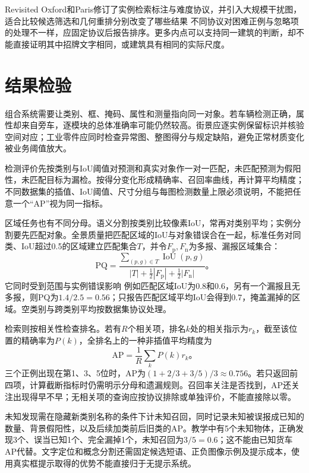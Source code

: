 Revisited Oxford和Paris修订了实例检索标注与难度协议，并引入大规模干扰图，适合比较候选筛选和几何重排分别改变了哪些结果
不同协议对困难正例与忽略项的处理不一样，应固定协议后报告排序。更多内点可以支持同一建筑的判断，却不能直接证明其中招牌文字相同，或建筑具有相同的实际尺度。

\section{结果检验}
\label{sec:vision-recognition-evaluation}

组合系统需要让类别、框、掩码、属性和测量指向同一对象。若车辆检测正确，属性却来自旁车，逐模块的总体准确率可能仍然较高。街景应逐实例保留标识并核验空间对应；工业零件应同时检查异常图、整图得分与规定缺陷，避免正常材质变化被业务阈值放大。

检测评价先按类别与IoU阈值对预测和真实对象作一对一匹配，未匹配预测为假阳性，未匹配目标为漏检。按得分变化形成精确率、召回率曲线，再计算平均精度；不同数据集的插值、IoU阈值、尺寸分组与每图检测数量上限必须说明，不能把任意一个“AP”视为同一指标。

区域任务也有不同分母。语义分割按类别比较像素IoU，常再对类别平均；实例分割要先匹配对象。全景质量把匹配区域的IoU与对象错误合在一起，标准任务对同类、IoU超过0.5的区域建立匹配集合$T$，并令$F_{\mathrm{p}},F_{\mathrm{n}}$为多报、漏报区域集合：
\begin{equation}
 \mathrm{PQ}=
 \frac{\sum_{(p,g)\in T}\operatorname{IoU}(p,g)}
 {|T|+\frac12|F_{\mathrm{p}}|+\frac12|F_{\mathrm{n}}|}\text{。}
 \label{eq:vision-pq}
\end{equation}
它同时受到范围与实例错误影响
例如匹配区域IoU为0.8和0.6，另有一个漏报且无多报，则PQ为$1.4/2.5=0.56$；只报告匹配区域平均IoU会得到0.7，掩盖漏掉的区域。空类别与跨类别平均按数据集协议处理。

检索则按相关性检查排名。若有$R$个相关项，排名$k$处的相关指示为$r_k$，截至该位置的精确率为$P(k)$，全排名上的一种非插值平均精度为
\begin{equation}
 \mathrm{AP}=\frac1R\sum_k P(k)r_k\text{。}
 \label{eq:vision-retrieval-ap}
\end{equation}
三个正例出现在第1、3、5位时，AP为$(1+2/3+3/5)/3\approx0.756$。若只返回前四项，计算截断指标时仍需明示分母和遗漏规则。召回率关注是否找到，AP还关注出现得早不早；无相关项的查询应按协议排除或单独评价，不能直接除以零。

未知发现需在隐藏新类别名称的条件下计未知召回，同时记录未知被误报成已知的数量、背景假阳性，以及后续加类前后旧类的AP。教学中有5个未知物体，正确发现3个、误当已知1个、完全漏掉1个，未知召回为$3/5=0.6$；这不能由已知货车AP代替。文字定位和概念分割还需固定候选短语、正负图像示例及提示成本，使用真实框提示取得的优势不能直接归于无提示系统。

